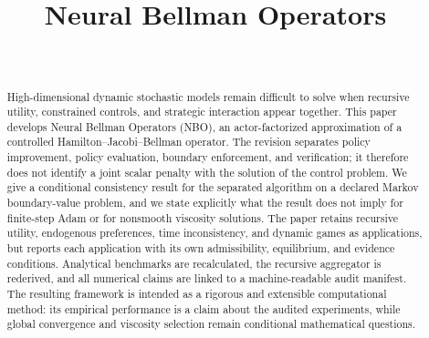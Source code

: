 \documentclass[ecta]{econsocart}
\theoremstyle{plain}
\theoremstyle{remark}
\begin{document}
\begin{frontmatter}

\title{Neural Bellman Operators}

\begin{aug}
\author[id=au1,addressref={add1}]
{~}

\address[id=add1]{%
,
}

\end{aug}


\begin{abstract}
High-dimensional dynamic stochastic models remain difficult to solve when recursive utility, constrained controls, and strategic interaction appear together. This paper develops Neural Bellman Operators (NBO), an actor-factorized approximation of a controlled Hamilton--Jacobi--Bellman operator. The revision separates policy improvement, policy evaluation, boundary enforcement, and verification; it therefore does not identify a joint scalar penalty with the solution of the control problem. We give a conditional consistency result for the separated algorithm on a declared Markov boundary-value problem, and we state explicitly what the result does not imply for finite-step Adam or for nonsmooth viscosity solutions. The paper retains recursive utility, endogenous preferences, time inconsistency, and dynamic games as applications, but reports each application with its own admissibility, equilibrium, and evidence conditions. Analytical benchmarks are recalculated, the recursive aggregator is rederived, and all numerical claims are linked to a machine-readable audit manifest. The resulting framework is intended as a rigorous and extensible computational method: its empirical performance is a claim about the audited experiments, while global convergence and viscosity selection remain conditional mathematical questions.
\end{abstract}

\begin{keyword}
\end{keyword}

\end{frontmatter}
\end{document}
